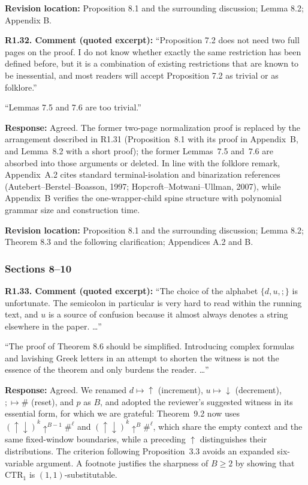 \documentclass[
  10pt,
  a4paper,
]{article}
\begin{document}
\textbf{Revision location:} Proposition 8.1 and the surrounding discussion; Lemma 8.2; Appendix B.


\textbf{R1.32. Comment (quoted excerpt):} ``Proposition 7.2 does not need two
full pages on the proof. I do not know whether exactly the same
restriction has been defined before, but it is a combination of existing
restrictions that are known to be inessential, and most readers will
accept Proposition 7.2 as trivial or as folklore.''

``Lemmas 7.5 and 7.6 are too trivial.''

\textbf{Response:} Agreed. The former two-page normalization proof is
replaced by the arrangement described in R1.31 (Proposition~8.1 with its
proof in Appendix~B, and Lemma~8.2 with a short proof); the former
Lemmas~7.5 and~7.6 are absorbed into those arguments or deleted. In line
with the folklore remark, Appendix~A.2 cites standard terminal-isolation
and binarization references (Autebert--Berstel--Boasson, 1997;
Hopcroft--Motwani--Ullman, 2007), while Appendix~B verifies the
one-wrapper-child spine structure with polynomial grammar size
and construction time.

\textbf{Revision location:} Proposition 8.1 and the surrounding discussion; Lemma 8.2; Theorem 8.3 and the following clarification; Appendices A.2 and B.


\subsubsection{Sections 8--10}\label{sections-810}

\textbf{R1.33. Comment (quoted excerpt):} ``The choice of the alphabet
\(\{d,u,;\}\) is unfortunate. The semicolon in particular is very hard
to read within the running text, and \(u\) is a source of confusion
because it almost always denotes a string elsewhere in the paper. \ldots{}''

``The proof of Theorem 8.6 should be simplified. Introducing complex
formulas and lavishing Greek letters in an attempt to shorten the
witness is not the essence of the theorem and only burdens the reader. \ldots{}''

\textbf{Response:} Agreed. We renamed $d\mapsto\uparrow$ (increment),
$u\mapsto\downarrow$ (decrement), $;\mapsto\#$ (reset), and $p$ as
$B$, and adopted the reviewer's suggested witness in its essential
form, for which we are grateful: Theorem~9.2 now uses
$(\uparrow\downarrow)^k\uparrow^{B-1}\#^\ell$ and
$(\uparrow\downarrow)^k\uparrow^B\#^\ell$, which share the empty
context and the same fixed-window boundaries, while a preceding
$\uparrow$ distinguishes their distributions. The criterion following
Proposition~3.3 avoids an expanded six-variable argument. A footnote
justifies the sharpness of $B\ge2$ by showing that $\mathrm{CTR}_1$ is
$(1,1)$-substitutable.
\end{document}
